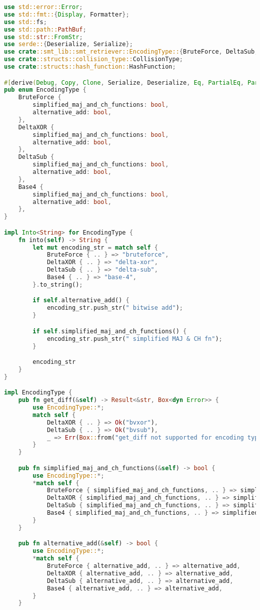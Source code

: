\begin{lstlisting}[language=rust, caption={smt\_lib/smt\_retriever.rs}]
use std::error::Error;
use std::fmt::{Display, Formatter};
use std::fs;
use std::path::PathBuf;
use std::str::FromStr;
use serde::{Deserialize, Serialize};
use crate::smt_lib::smt_retriever::EncodingType::{BruteForce, DeltaSub, DeltaXOR, Base4};
use crate::structs::collision_type::CollisionType;
use crate::structs::hash_function::HashFunction;

#[derive(Debug, Copy, Clone, Serialize, Deserialize, Eq, PartialEq, PartialOrd, Ord)]
pub enum EncodingType {
	BruteForce {
		simplified_maj_and_ch_functions: bool,
		alternative_add: bool,
	},
	DeltaXOR {
		simplified_maj_and_ch_functions: bool,
		alternative_add: bool,
	},
	DeltaSub {
		simplified_maj_and_ch_functions: bool,
		alternative_add: bool,
	},
	Base4 {
		simplified_maj_and_ch_functions: bool,
		alternative_add: bool,
	},
}

impl Into<String> for EncodingType {
	fn into(self) -> String {
		let mut encoding_str = match self {
			BruteForce { .. } => "bruteforce",
			DeltaXOR { .. } => "delta-xor",
			DeltaSub { .. } => "delta-sub",
			Base4 { .. } => "base-4",
		}.to_string();

		if self.alternative_add() {
			encoding_str.push_str(" bitwise add");
		}

		if self.simplified_maj_and_ch_functions() {
			encoding_str.push_str(" simplified MAJ & CH fn");
		}

		encoding_str
	}
}

impl EncodingType {
	pub fn get_diff(&self) -> Result<&str, Box<dyn Error>> {
		use EncodingType::*;
		match self {
			DeltaXOR { .. } => Ok("bvxor"),
			DeltaSub { .. } => Ok("bvsub"),
			_ => Err(Box::from("get_diff not supported for encoding type")),
		}
	}

	pub fn simplified_maj_and_ch_functions(&self) -> bool {
		use EncodingType::*;
		*match self {
			BruteForce { simplified_maj_and_ch_functions, .. } => simplified_maj_and_ch_functions,
			DeltaXOR { simplified_maj_and_ch_functions, .. } => simplified_maj_and_ch_functions,
			DeltaSub { simplified_maj_and_ch_functions, .. } => simplified_maj_and_ch_functions,
			Base4 { simplified_maj_and_ch_functions, .. } => simplified_maj_and_ch_functions,
		}
	}

	pub fn alternative_add(&self) -> bool {
		use EncodingType::*;
		*match self {
			BruteForce { alternative_add, .. } => alternative_add,
			DeltaXOR { alternative_add, .. } => alternative_add,
			DeltaSub { alternative_add, .. } => alternative_add,
			Base4 { alternative_add, .. } => alternative_add,
		}
	}


\end{lstlisting}
